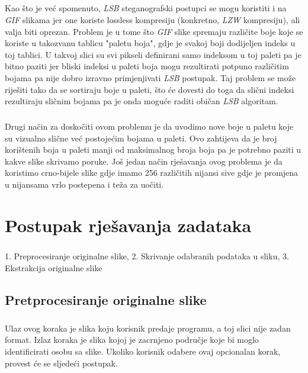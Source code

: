 \documentclass[times, utf8, seminar, numeric]{fer}
\begin{document}
\paragraph{}
Kao što je već spomenuto, \textit{LSB} steganografski postupci se mogu koristiti i na \textit{GIF} slikama jer one koriste lossless kompresiju (konkretno, \textit{LZW} kompresiju), ali valja biti oprezan. Problem je u tome što \textit{GIF} slike spremaju različite boje koje se koriste u takozvanu tablicu "paletu boja", gdje je svakoj boji dodijeljen indeks u toj tablici. U takvoj slici su svi pikseli definirani samo indeksom u toj paleti pa je bitno paziti jer bliski indeksi u paleti boja mogu rezultirati potpuno različitim bojama pa nije dobro izravno primjenjivati \textit{LSB} postupak. Taj problem se može riješiti tako da se sortiraju boje u paleti, što će dovesti do toga da slični indeksi rezultiraju sličnim bojama pa je onda moguće raditi običan \textit{LSB} algoritam.
\paragraph{}
Drugi način za doskočiti ovom problemu je da uvodimo nove boje u paletu koje su vizualno slične već postojećim bojama u paleti. Ovo zahtijeva da je broj korištenih boja u paleti manji od maksimalnog broja boja pa je potrebno paziti u kakve slike skrivamo poruke. Još jedan način rješavanja ovog problema je da koristimo crno-bijele slike gdje imamo 256 različitih nijansi sive gdje je promjena u nijansama vrlo postepena i teža za uočiti.
\chapter{Postupak rješavanja zadataka}
\paragraph{}
1. Preprocesiranje originalne slike, 2. Skrivanje odabranih podataka u sliku, 3. Ekstrakcija originalne slike
\section{Pretprocesiranje originalne slike}
\paragraph{}
Ulaz ovog koraka je slika koju korisnik predaje programu, a toj slici nije zadan format. Izlaz koraka je slika kojoj je zacrnjeno područje koje bi moglo identificirati osobu sa slike. Ukoliko korisnik odabere ovaj opcionalan korak, provest će se sljedeći postupak.
\end{document}

